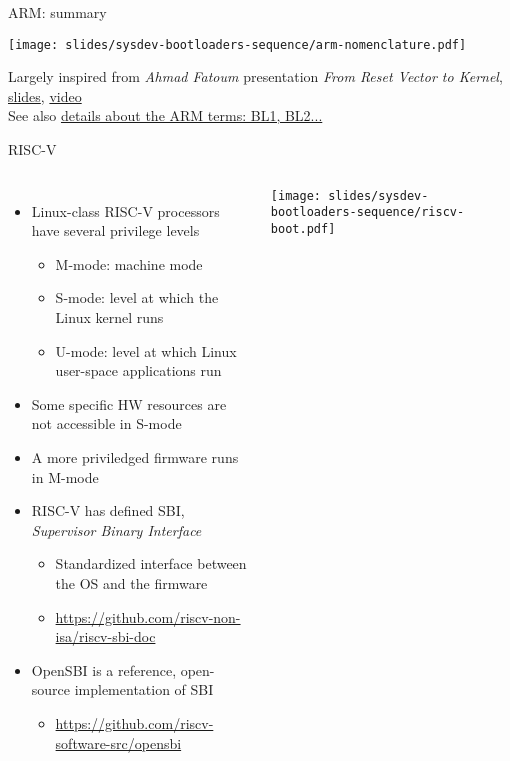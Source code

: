 \begin{frame}{ARM: summary}
  \begin{center}
    \texttt{[image: slides/sysdev-bootloaders-sequence/arm-nomenclature.pdf]}
  \end{center}
  {\footnotesize Largely inspired from {\em Ahmad Fatoum} presentation
    {\em From Reset Vector to Kernel},
    \href{https://archive.fosdem.org/2021/schedule/event/from_reset_vector_to_kernel/attachments/slides/4632/export/events/attachments/from_reset_vector_to_kernel/slides/4632/from_reset_vector_to_kernel.pdf}{slides},
    \href{https://www.youtube.com/watch?v=-Ak9MWGxd7M}{video}}\\
    See also
    \href{https://trustedfirmware-a.readthedocs.io/en/latest/design/firmware-design.html}
    {details about the ARM terms: BL1, BL2...}
\end{frame}

\begin{frame}{RISC-V}
  \begin{columns}[T]
    \begin{itemize}
    \item Linux-class RISC-V processors have several privilege levels
      \begin{itemize}
      \item M-mode: machine mode
      \item S-mode: level at which the Linux kernel runs
      \item U-mode: level at which Linux user-space
        applications run
      \end{itemize}
    \item Some specific HW resources are not accessible in S-mode
    \item A more priviledged firmware runs in M-mode
    \item RISC-V has defined SBI, {\em Supervisor Binary Interface}
      \begin{itemize}
      \item Standardized interface between the OS and the firmware
      \item \url{https://github.com/riscv-non-isa/riscv-sbi-doc}
      \end{itemize}
    \item OpenSBI is a reference, open-source implementation of SBI
      \begin{itemize}
      \item \url{https://github.com/riscv-software-src/opensbi}
      \end{itemize}
    \end{itemize}
    \texttt{[image: slides/sysdev-bootloaders-sequence/riscv-boot.pdf]}
  \end{columns}
\end{frame}

